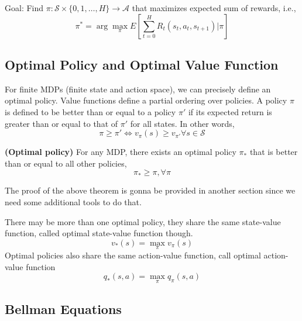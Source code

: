 Goal: Find $\pi: \mathcal{S}\times\{0,1,\ldots,H\}\rightarrow \mathcal{A}$ that 
maximizes expected sum of rewards, i.e., 
$$
\pi^*=\arg\max_\pi E\left[ \sum_{t=0}^H R_t(s_t, a_t, s_{t+1}) | \pi \right]
$$


\subsection{Optimal Policy and Optimal Value Function}

For finite MDPs (finite state and action space), we can precisely define an 
optimal policy. Value functions define a partial ordering over policies. A 
policy $\pi$ is defined to be better than or equal to a policy $\pi'$ if its 
expected return is greater than or equal to that of $\pi'$ for all states. In 
other words, 
\begin{equation} 
\pi\geq\pi'\iff v_\pi(s)\geq v_{\pi'} \forall s\in\mathcal{S} 
\end{equation}

\begin{theorem} {\rm\bf (Optimal policy)}
For any MDP, there exists an optimal policy $\pi_*$ that is better than or equal 
to all other policies, 
\begin{equation} 
\pi_*\geq\pi,\forall\pi 
\end{equation}
\end{theorem}

The proof of the above theorem is gonna be provided in another section since we 
need some additional tools to do that.

There may be more than one optimal policy, they share the same state-value function, 
called optimal state-value function though. 
\begin{equation} 
v_*(s)=\max_{\pi}v_\pi(s) 
\end{equation} 
Optimal policies also share the same action-value function, call optimal action-value 
function 
\begin{equation} 
q_*(s,a)=\max_{\pi}q_\pi(s,a) 
\end{equation}


\subsection{Bellman Equations}

